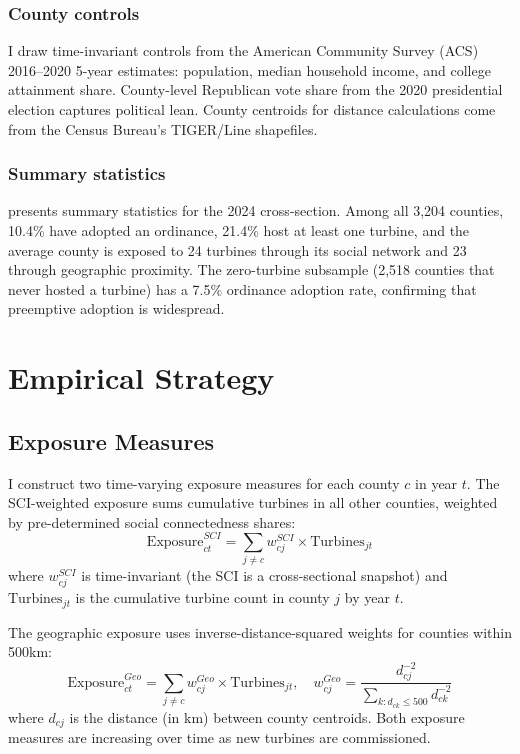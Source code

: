 \documentclass[12pt]{article}
\begin{document}
\subsubsection*{County controls} I draw time-invariant controls from the American Community Survey (ACS) 2016--2020 5-year estimates: population, median household income, and college attainment share. County-level Republican vote share from the 2020 presidential election captures political lean. County centroids for distance calculations come from the Census Bureau's TIGER/Line shapefiles.

\subsubsection*{Summary statistics}  presents summary statistics for the 2024 cross-section. Among all 3,204 counties, 10.4\% have adopted an ordinance, 21.4\% host at least one turbine, and the average county is exposed to 24 turbines through its social network and 23 through geographic proximity. The zero-turbine subsample (2,518 counties that never hosted a turbine) has a 7.5\% ordinance adoption rate, confirming that preemptive adoption is widespread.




\section{Empirical Strategy}

\subsection{Exposure Measures}

I construct two time-varying exposure measures for each county $c$ in year $t$. The SCI-weighted exposure sums cumulative turbines in all other counties, weighted by pre-determined social connectedness shares:
\begin{equation}
\text{Exposure}_{ct}^{SCI} = \sum_{j \neq c} w_{cj}^{SCI} \times \text{Turbines}_{jt}
\label{eq:sci_exposure}
\end{equation}
where $w_{cj}^{SCI}$ is time-invariant (the SCI is a cross-sectional snapshot) and $\text{Turbines}_{jt}$ is the cumulative turbine count in county $j$ by year $t$.

The geographic exposure uses inverse-distance-squared weights for counties within 500km:
\begin{equation}
\text{Exposure}_{ct}^{Geo} = \sum_{j \neq c} w_{cj}^{Geo} \times \text{Turbines}_{jt}, \quad w_{cj}^{Geo} = \frac{d_{cj}^{-2}}{\sum_{k: d_{ck} \leq 500} d_{ck}^{-2}}
\label{eq:geo_exposure}
\end{equation}
where $d_{cj}$ is the distance (in km) between county centroids. Both exposure measures are increasing over time as new turbines are commissioned.
\end{document}
